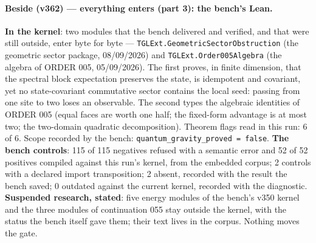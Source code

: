 \documentclass[11pt]{article}
\theoremstyle{definition}\newtheorem{deriv}{Derivation}
\begin{document}
\paragraph*{Beside (v362) --- everything enters (part 3): the bench's Lean.} \textbf{In the kernel}: two modules that the bench delivered and verified, and that were still outside, enter byte for byte --- \texttt{TGLExt.GeometricSectorObstruction} (the geometric sector package, 08/09/2026) and \texttt{TGLExt.Order005Algebra} (the algebra of ORDER 005, 05/09/2026). The first proves, in finite dimension, that the spectral block expectation preserves the state, is idempotent and covariant, yet no state-covariant commutative sector contains the local seed: passing from one site to two loses an observable. The second types the algebraic identities of ORDER 005 (equal faces are worth one half; the fixed-form advantage is at most two; the two-domain quadratic decomposition). Theorem flags read in this run: 6 of 6. Scope recorded by the bench: \texttt{quantum\_gravity\_proved = false}. \textbf{The bench controls}: 115 of 115 negatives refused with a semantic error and 52 of 52 positives compiled against this run's kernel, from the embedded corpus; 2 controls with a declared import transposition; 2 absent, recorded with the result the bench saved; 0 outdated against the current kernel, recorded with the diagnostic. \textbf{Suspended research, stated}: five energy modules of the bench's v350 kernel and the three modules of continuation 055 stay outside the kernel, with the status the bench itself gave them; their text lives in the corpus. Nothing moves the gate.
\end{document}
